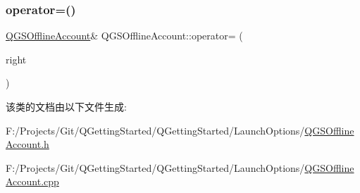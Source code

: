 \subsubsection{\texorpdfstring{operator=()}{operator=()}\hspace{0.1cm}{\footnotesize\ttfamily [2/2]}}
{\footnotesize\ttfamily \mbox{\hyperlink{class_q_g_s_offline_account}{Q\+G\+S\+Offline\+Account}}\& Q\+G\+S\+Offline\+Account\+::operator= (\begin{DoxyParamCaption}\item[{\mbox{\hyperlink{class_q_g_s_offline_account}{Q\+G\+S\+Offline\+Account}} \&\&}]{right }\end{DoxyParamCaption})\hspace{0.3cm}{\ttfamily [default]}}



该类的文档由以下文件生成\+:\begin{DoxyCompactItemize}
\item 
F\+:/\+Projects/\+Git/\+Q\+Getting\+Started/\+Q\+Getting\+Started/\+Launch\+Options/\mbox{\hyperlink{_q_g_s_offline_account_8h}{Q\+G\+S\+Offline\+Account.\+h}}\item 
F\+:/\+Projects/\+Git/\+Q\+Getting\+Started/\+Q\+Getting\+Started/\+Launch\+Options/\mbox{\hyperlink{_q_g_s_offline_account_8cpp}{Q\+G\+S\+Offline\+Account.\+cpp}}\end{DoxyCompactItemize}
